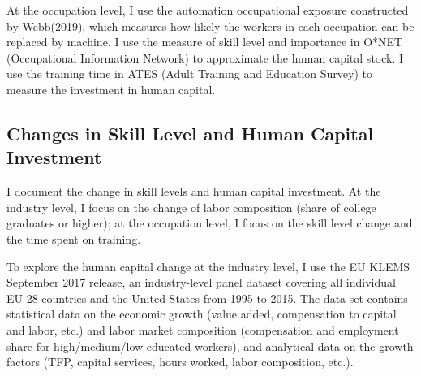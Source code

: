 \documentclass[12pt]{article}
\begin{document}
At the occupation level, I use the automation occupational exposure constructed by Webb(2019)\nocite{Webb2019}, which measures how likely the workers in each occupation can be replaced by machine. I use the measure of skill level and importance in O*NET (Occupational Information Network) to approximate the human capital stock. I use the training time in ATES (Adult Training and Education Survey) to measure the investment in human capital.

\subsection{Changes in Skill Level and Human Capital Investment}
I document the change in skill levels and human capital investment. At the industry level, I focus on the change of labor composition (share of college graduates or higher); at the occupation level, I focus on the skill level change and the time spent on training. 
 
To explore the human capital change at the industry level, I use the EU KLEMS September 2017 release, an industry-level panel dataset covering all individual EU-28 countries and the United States from 1995 to 2015. The data set contains statistical data on the economic growth (value added, compensation to capital and labor, etc.) and labor market composition (compensation and employment share for high/medium/low educated workers), and analytical data on the growth factors (TFP, capital services, hours worked, labor composition, etc.). 
\end{document}
